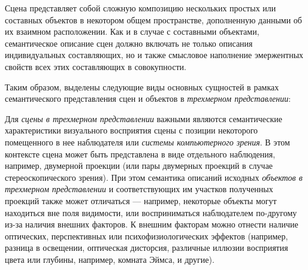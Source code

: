Сцена представляет собой сложную композицию нескольких простых или составных объектов в некотором общем пространстве, дополненную данными об их взаимном расположении. Как и в случае с составными объектами, семантическое описание сцен должно включать не только описания индивидуальных составляющих, но и также смысловое наполнение эмержентных свойств всех этих составляющих в совокупности.

Таким образом, выделены следующие виды основных сущностей в рамках семантического представления сцен и объектов в \textit{трехмерном представлении}:

\begin{SCn}
\end{SCn}
\begin{SCn}
\end{SCn}
\begin{SCn}
\end{SCn}
\begin{SCn}
\end{SCn}

Для \textit{сцены в трехмерном представлении} важными являются семантические характеристики визуального восприятия сцены с позиции некоторого помещенного в нее наблюдателя или \textit{системы компьютерного зрения}. В этом контексте сцена может быть представлена в виде отдельного наблюдения, например, двумерной проекции (или пары двумерных проекций в случае стереоскопического зрения). При этом семантика описаний исходных \textit{объектов в трехмерном представлении} и соответствующих им участков полученных проекций также может отличаться --- например, некоторые объекты могут находиться вне поля видимости, или восприниматься наблюдателем по-другому из-за наличия внешних факторов. К внешним факторам можно отнести наличие оптических, перспективных или психофизиологических эффектов (например, разница в освещении, оптическая дисторсия, различные иллюзии восприятия цвета или глубины, например, комната Эймса, и другие). 

